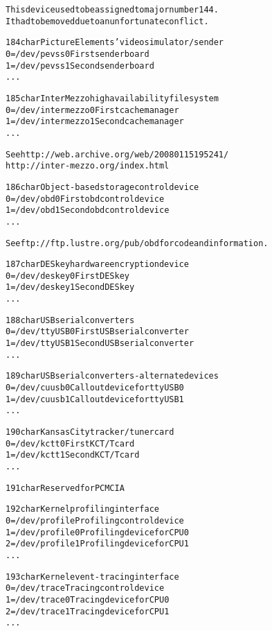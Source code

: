 \documentclass[a4paper,8pt,english]{sphinxmanual}
\begin{document}
\begin{alltt}
                This device used to be assigned to major number 144.
                It had to be moved due to an unfortunate conflict.

 184 char       Picture Elements' video simulator/sender
                  0 = /dev/pevss0       First sender board
                  1 = /dev/pevss1       Second sender board
                    ...

 185 char       InterMezzo high availability file system
                  0 = /dev/intermezzo0  First cache manager
                  1 = /dev/intermezzo1  Second cache manager
                    ...

                See http://web.archive.org/web/20080115195241/
                http://inter-mezzo.org/index.html

 186 char       Object-based storage control device
                  0 = /dev/obd0         First obd control device
                  1 = /dev/obd1         Second obd control device
                    ...

                See ftp://ftp.lustre.org/pub/obd for code and information.

 187 char       DESkey hardware encryption device
                  0 = /dev/deskey0      First DES key
                  1 = /dev/deskey1      Second DES key
                    ...

 188 char       USB serial converters
                  0 = /dev/ttyUSB0      First USB serial converter
                  1 = /dev/ttyUSB1      Second USB serial converter
                    ...

 189 char       USB serial converters - alternate devices
                  0 = /dev/cuusb0       Callout device for ttyUSB0
                  1 = /dev/cuusb1       Callout device for ttyUSB1
                    ...

 190 char       Kansas City tracker/tuner card
                  0 = /dev/kctt0        First KCT/T card
                  1 = /dev/kctt1        Second KCT/T card
                    ...

 191 char       Reserved for PCMCIA

 192 char       Kernel profiling interface
                  0 = /dev/profile      Profiling control device
                  1 = /dev/profile0     Profiling device for CPU 0
                  2 = /dev/profile1     Profiling device for CPU 1
                    ...

 193 char       Kernel event-tracing interface
                  0 = /dev/trace        Tracing control device
                  1 = /dev/trace0       Tracing device for CPU 0
                  2 = /dev/trace1       Tracing device for CPU 1
                    ...


\end{alltt}
\end{document}
